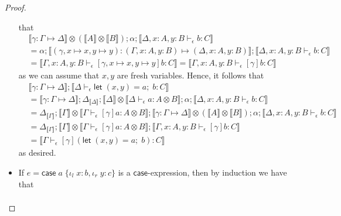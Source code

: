\documentclass[acmsmall,screen,review]{acmart}
\newcommand{\ms}[1]{\ensuremath{\mathsf{#1}}}
\newcommand{\lto}{:}
\newcommand{\linl}[1]{\iota_l\;{#1}}
\newcommand{\linr}[1]{\iota_r\;{#1}}
\newcommand{\letexpr}[3]{\ensuremath{\ms{let}\;#1 = #2;\;#3}}
\newcommand{\caseexpr}[5]{\ms{case}\;#1\;\{\linl{#2} \lto #3, \linr{#4} \lto #5\}}
\newcommand{\bhyp}[2]{#1 : #2}
\newcommand{\hasty}[4]{#1 \vdash_{#2} #3: {#4}}
\newcommand{\issubst}[3]{#1: #2 \mapsto #3}
\newcommand{\dnt}[1]{\llbracket{#1}\rrbracket}
\begin{document}
\begin{proof}
\begin{itemize}[leftmargin=*]
    that
    \begin{equation}
      \begin{aligned}
      & \dnt{\issubst{\gamma}{\Gamma}{\Delta}} \otimes (\dnt{A} \otimes \dnt{B}) 
          ; \alpha ; \dnt{\hasty{\Delta, \bhyp{x}{A}, \bhyp{y}{B}}{\epsilon}{b}{C}}
      \\ &= \alpha ; \dnt{\issubst{(\gamma, x \mapsto x, y \mapsto y)}
        {(\Gamma, \bhyp{x}{A}, \bhyp{y}{B})}{(\Delta, \bhyp{x}{A}, \bhyp{y}{B})}}
          ; \dnt{\hasty{\Delta, \bhyp{x}{A}, \bhyp{y}{B}}{\epsilon}{b}{C}}
      \\ &= \dnt{\hasty{\Gamma, \bhyp{x}{A}, \bhyp{y}{B}}
                        {\epsilon}{[\gamma, x \mapsto x, y \mapsto y]b}{C}}
          = \dnt{\hasty{\Gamma, \bhyp{x}{A}, \bhyp{y}{B}}{\epsilon}{[\gamma]b}{C}}
      \end{aligned}
    \end{equation}
    as we can assume that $x, y$ are fresh variables. Hence, it follows that
    \begin{equation}
      \begin{aligned}
        & \dnt{\issubst{\gamma}{\Gamma}{\Delta}} 
        ; \dnt{\hasty{\Delta}{\epsilon}{\letexpr{(x, y)}{a}{b}}{C}} \\
        &= \dnt{\issubst{\gamma}{\Gamma}{\Delta}}
        ; \Delta_{\dnt{\Delta}} 
        ; \dnt{\Delta} \otimes \dnt{\hasty{\Delta}{\epsilon}{a}{A \otimes B}}
        ; \alpha ; \dnt{\hasty{\Delta, \bhyp{x}{A}, \bhyp{y}{B}}{\epsilon}{b}{C}} \\
        &= \Delta_{\dnt{\Gamma}} 
        ; \dnt{\Gamma} \otimes \dnt{\hasty{\Gamma}{\epsilon}{[\gamma]a}{A \otimes B}}
        ; \dnt{\issubst{\gamma}{\Gamma}{\Delta}} \otimes (\dnt{A} \otimes \dnt{B}) ; \alpha
        ; \dnt{\hasty{\Delta, \bhyp{x}{A}, \bhyp{y}{B}}{\epsilon}{b}{C}} \\
        &= \Delta_{\dnt{\Gamma}}
        ; \dnt{\Gamma} \otimes \dnt{\hasty{\Gamma}{\epsilon}{[\gamma]a}{A \otimes B}}
        ; \dnt{\hasty{\Gamma, \bhyp{x}{A}, \bhyp{y}{B}}{\epsilon}{[\gamma]b}{C}} \\
        &= \dnt{\hasty{\Gamma}{\epsilon}{[\gamma](\letexpr{(x, y)}{a}{b})}{C}}
      \end{aligned}
    \end{equation}
    as desired.
    \item If $e = \caseexpr{a}{x}{b}{y}{c}$ is a \ms{case}-expression, then by induction we have
    that
    \begin{equation}
      \begin{aligned}

\end{aligned}
\end{equation}
\end{itemize}
\end{proof}
\end{document}
